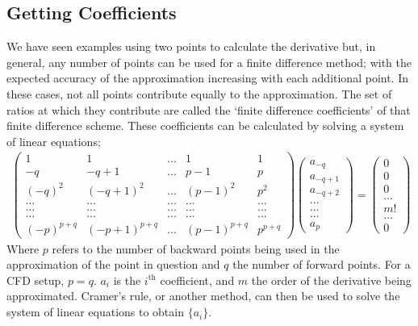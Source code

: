\subsection{Getting Coefficients}
We have seen examples using two points to calculate the derivative but, in general, any number of points can be used for a finite difference method; with the expected accuracy of the approximation increasing with each additional point. In these cases, not all points contribute equally to the approximation. The set of ratios at which they contribute are called the `finite difference coefficients' of that finite difference scheme. These coefficients can be calculated by solving a system of linear equations\cite{coeffs};
\begin{align*}
\begin{pmatrix}
1&1&...&1&1\\
-q&-q+1&...&p-1&p\\
(-q)^{2}&(-q+1)^{2}&...&(p-1)^{2}&p^{2}\\
...&...&...&...&...\\
...&...&...&...&...\\
...&...&...&...&...\\
(-p)^{p+q}&(-p+1)^{p+q}&...&(p-1)^{p+q}&p^{p+q}
\end{pmatrix}{\begin{pmatrix}
a_{-q}\\
a_{-q+1}\\
a_{-q+2}\\
...\\
...\\
...\\
a_{p}
\end{pmatrix}} = {\begin{pmatrix}
0\\
0\\
0\\
...\\
m!\\
...\\
0
\end{pmatrix}}
\end{align*}
Where $p$ refers to the number of backward points being used in the approximation of the point in question and $q$ the number of forward points. For a CFD setup, $p=q$. 
$a_{i}$ is the $i^{\text{th}}$ coefficient, and $m$ the order of the derivative being approximated. Cramer's rule, or another method, can then be used to solve the system of linear equations to obtain $\{a_{i}\}$.

